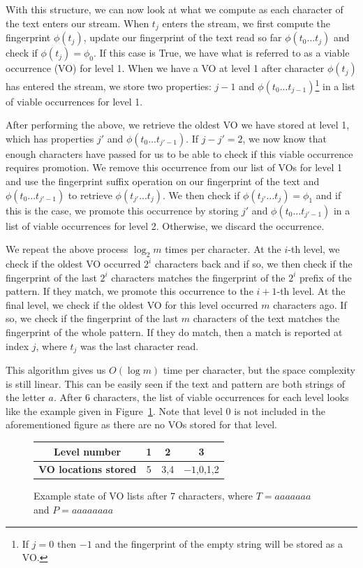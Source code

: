 \documentclass[ %
                    author={Dominic Joseph Moylett},
                    degree={MEng},
                     title={Dictionary Matching with Fingerprints},
                  subtitle={An Empirical Analysis},
                      type={research},
                      year={2015} ]{dissertation}
\begin{document}
With this structure, we can now look at what we compute as each character of the text enters our stream. When $t_j$ enters the stream, we first compute the fingerprint $\phi(t_j)$, update our fingerprint of the text read so far $\phi(t_0...t_j)$ and check if $\phi(t_j) = \phi_0$. If this case is True, we have what is referred to as a viable occurrence (VO) for level 1. When we have a VO at level 1 after character $\phi(t_j)$ has entered the stream, we store two properties: $j-1$ and $\phi(t_0...t_{j-1})$\footnote{If $j = 0$ then $-1$ and the fingerprint of the empty string will be stored as a VO.} in a list of viable occurrences for level 1.

After performing the above, we retrieve the oldest VO we have stored at level 1, which has properties $j'$ and $\phi(t_0...t_{j'-1})$. If $j - j' = 2$, we now know that enough characters have passed for us to be able to check if this viable occurrence requires promotion. We remove this occurrence from our list of VOs for level 1 and use the fingerprint suffix operation on our fingerprint of the text and $\phi(t_0...t_{j'-1})$ to retrieve $\phi(t_{j'}...t_j)$. We then check if $\phi(t_{j'}...t_j) = \phi_1$ and if this is the case, we promote this occurrence by storing $j'$ and $\phi(t_0...t_{j'-1})$ in a list of viable occurrences for level 2. Otherwise, we discard the occurrence.

We repeat the above process $\log_2m$ times per character. At the $i$-th level, we check if the oldest VO occurred $2^i$ characters back and if so, we then check if the fingerprint of the last $2^i$ characters matches the fingerprint of the $2^i$ prefix of the pattern. If they match, we promote this occurrence to the $i+1$-th level. At the final level, we check if the oldest VO for this level occurred $m$ characters ago. If so, we check if the fingerprint of the last $m$ characters of the text matches the fingerprint of the whole pattern. If they do match, then a match is reported at index $j$, where $t_j$ was the last character read.

This algorithm gives us $O(\log m)$ time per character, but the space complexity is still linear. This can be easily seen if the text and pattern are both strings of the letter $a$. After 6 characters, the list of viable occurrences for each level looks like the example given in Figure~\ref{fig:pp-vos}. Note that level 0 is not included in the aforementioned figure as there are no VOs stored for that level.

\begin{figure}[t]
\centering
\begin{tabular}{|c|c|c|c|}
  \hline
  \textbf{Level number} & 1 & 2 & 3 \\
  \hline
  \textbf{VO locations stored} & 5 & 3,4 & $-1$,0,1,2 \\
  \hline
\end{tabular}
\caption{Example state of VO lists after 7 characters, where $T = aaaaaaa$ and $P = aaaaaaaa$}
\label{fig:pp-vos}
\end{figure}
\end{document}
